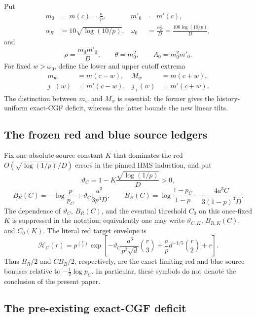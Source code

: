 Put
\[
\begin{aligned}
 m_0&=m(c)=\frac ap,&m'_0&=m'(c),\\
 \alpha_R&=10\sqrt{\log(10/p)},&
 \omega_0&=\frac{\alpha_R^2}{D}
 =\frac{100\log(10/p)}D,
\end{aligned}
\tag{2.7}
\]
and
\[
 \rho=\frac{m_0m'_0}{D},\qquad
 \theta=m_0^2,\qquad A_0=m_0^2m'_0.
\tag{2.8}
\]
For fixed \(w>\omega_0\), define the lower and upper cutoff extrema
\[
\begin{aligned}
 m_w&=m(c-w),&M_w&=m(c+w),\\
 j_-(w)&=m'(c-w),&j_+(w)&=m'(c+w).
\end{aligned}
\tag{2.9}
\]
The distinction between \(m_w\) and \(M_w\) is essential: the former gives
the history-uniform exact-CGF deficit, whereas the latter bounds the new
linear tilts.

\subsection{The frozen red and blue source ledgers}

Fix one absolute source constant \(K\) that dominates the red
\(O(\sqrt{\log(1/p)}/D)\) errors in the pinned HMS induction, and put
\[
 \vartheta_C=1-K\frac{\sqrt{\log(1/p)}}D>0,
\tag{2.10}\label{eq:source-K}
\]
\[
 B_R(C)=-\log\frac p{p_C}
 +\vartheta_C\frac{a^3}{3p^3D},\qquad
 B_B(C)=\log\frac{1-p_C}{1-p}
 -\frac{4a^3C}{3(1-p)^3D}.
\tag{2.11}
\]
The dependence of \(\vartheta_C\), \(B_R(C)\), and the eventual threshold
\(C_0\) on this once-fixed \(K\) is suppressed in the notation; equivalently
one may write \(\vartheta_{C,K}\), \(B_{R,K}(C)\), and \(C_0(K)\).
The literal red target envelope is
\[
 \mathcal H_C(r)=p^{\binom r2}
 \exp\!\left[-\vartheta_C\frac{a^3}{p^3\sqrt d}\binom r3
 +\frac apd^{-1/5}\binom r2+r\right].
\tag{2.12}
\]
Thus \(B_R/2\) and \(CB_B/2\), respectively, are the exact limiting red
and blue source bonuses relative to \(-\tfrac12\log p_C\).  In particular,
these symbols do not denote the conclusion of the present paper.

\subsection{The pre-existing exact-CGF deficit}

